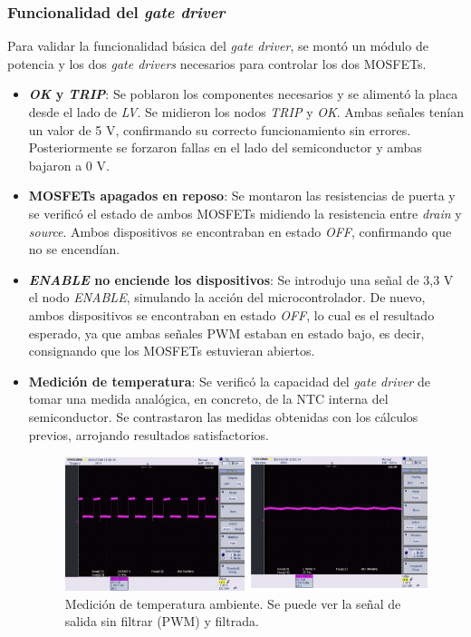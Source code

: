 \subsubsection{Funcionalidad del \textit{gate driver}}
Para validar la funcionalidad básica del \textit{gate driver}, se montó un módulo de potencia y los dos \textit{gate drivers} necesarios para controlar los dos MOSFETs.

\begin{itemize}
	\item \textbf{\textit{OK} y \textit{TRIP}}: Se poblaron los componentes necesarios y se alimentó la placa desde el lado de \textit{LV}. Se midieron los nodos \textit{TRIP} y \textit{OK}. Ambas señales tenían un valor de 5 V, confirmando su correcto funcionamiento sin errores. Posteriormente se forzaron fallas en el lado del semiconductor y ambas bajaron a 0 V.
	\item \textbf{MOSFETs apagados en reposo}: Se montaron las resistencias de puerta y se verificó el estado de ambos MOSFETs midiendo la resistencia entre \textit{drain} y \textit{source}. Ambos dispositivos se encontraban en estado \textit{OFF}, confirmando que no se encendían.
	\item \textbf{\textit{ENABLE} no enciende los dispositivos}: Se introdujo una señal de 3,3 V el nodo \textit{ENABLE}, simulando la acción del microcontrolador. De nuevo, ambos dispositivos se encontraban en estado \textit{OFF}, lo cual es el resultado esperado, ya que ambas señales PWM estaban en estado bajo, es decir, consignando que los MOSFETs estuvieran abiertos.
	\item \textbf{Medición de temperatura}: Se verificó la capacidad del \textit{gate driver} de tomar una medida analógica, en concreto, de la NTC interna del semiconductor. Se contrastaron las medidas obtenidas con los cálculos previos, arrojando resultados satisfactorios.
	
	\begin{figure}[H]
		\centering
		\includegraphics[width=0.7\linewidth]{fig/NTC-driver}
		\caption{Medición de temperatura ambiente. Se puede ver la señal de salida sin filtrar (PWM) y filtrada.}
	\end{figure}
	
\end{itemize}
	
